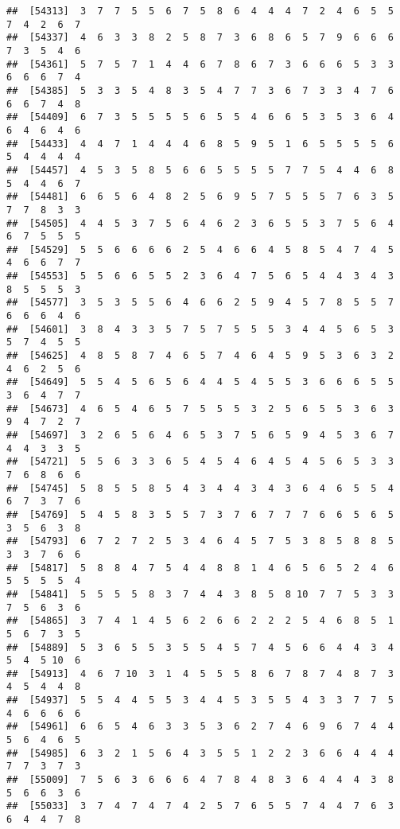 \documentclass[
]{book}
\begin{document}
\begin{verbatim}
##  [54313]  3  7  7  5  5  6  7  5  8  6  4  4  4  7  2  4  6  5  5  7  4  2  6  7
##  [54337]  4  6  3  3  8  2  5  8  7  3  6  8  6  5  7  9  6  6  6  7  3  5  4  6
##  [54361]  5  7  5  7  1  4  4  6  7  8  6  7  3  6  6  6  5  3  3  6  6  6  7  4
##  [54385]  5  3  3  5  4  8  3  5  4  7  7  3  6  7  3  3  4  7  6  6  6  7  4  8
##  [54409]  6  7  3  5  5  5  5  6  5  5  4  6  6  5  3  5  3  6  4  6  4  6  4  6
##  [54433]  4  4  7  1  4  4  4  6  8  5  9  5  1  6  5  5  5  5  6  5  4  4  4  4
##  [54457]  4  5  3  5  8  5  6  6  5  5  5  5  7  7  5  4  4  6  8  5  4  4  6  7
##  [54481]  6  6  5  6  4  8  2  5  6  9  5  7  5  5  5  7  6  3  5  7  7  8  3  3
##  [54505]  4  4  5  3  7  5  6  4  6  2  3  6  5  5  3  7  5  6  4  6  7  5  5  5
##  [54529]  5  5  6  6  6  6  2  5  4  6  6  4  5  8  5  4  7  4  5  4  6  6  7  7
##  [54553]  5  5  6  6  5  5  2  3  6  4  7  5  6  5  4  4  3  4  3  8  5  5  5  3
##  [54577]  3  5  3  5  5  6  4  6  6  2  5  9  4  5  7  8  5  5  7  6  6  6  4  6
##  [54601]  3  8  4  3  3  5  7  5  7  5  5  5  3  4  4  5  6  5  3  5  7  4  5  5
##  [54625]  4  8  5  8  7  4  6  5  7  4  6  4  5  9  5  3  6  3  2  4  6  2  5  6
##  [54649]  5  5  4  5  6  5  6  4  4  5  4  5  5  3  6  6  6  5  5  3  6  4  7  7
##  [54673]  4  6  5  4  6  5  7  5  5  5  3  2  5  6  5  5  3  6  3  9  4  7  2  7
##  [54697]  3  2  6  5  6  4  6  5  3  7  5  6  5  9  4  5  3  6  7  4  4  3  3  5
##  [54721]  5  5  6  3  3  6  5  4  5  4  6  4  5  4  5  6  5  3  3  7  6  8  6  6
##  [54745]  5  8  5  5  8  5  4  3  4  4  3  4  3  6  4  6  5  5  4  6  7  3  7  6
##  [54769]  5  4  5  8  3  5  5  7  3  7  6  7  7  7  6  6  5  6  5  3  5  6  3  8
##  [54793]  6  7  2  7  2  5  3  4  6  4  5  7  5  3  8  5  8  8  5  3  3  7  6  6
##  [54817]  5  8  8  4  7  5  4  4  8  8  1  4  6  5  6  5  2  4  6  5  5  5  5  4
##  [54841]  5  5  5  5  8  3  7  4  4  3  8  5  8 10  7  7  5  3  3  7  5  6  3  6
##  [54865]  3  7  4  1  4  5  6  2  6  6  2  2  2  5  4  6  8  5  1  5  6  7  3  5
##  [54889]  5  3  6  5  5  3  5  5  4  5  7  4  5  6  6  4  4  3  4  5  4  5 10  6
##  [54913]  4  6  7 10  3  1  4  5  5  5  8  6  7  8  7  4  8  7  3  4  5  4  4  8
##  [54937]  5  5  4  4  5  5  3  4  4  5  3  5  5  4  3  3  7  7  5  4  6  6  6  6
##  [54961]  6  6  5  4  6  3  3  5  3  6  2  7  4  6  9  6  7  4  4  5  6  4  6  5
##  [54985]  6  3  2  1  5  6  4  3  5  5  1  2  2  3  6  6  4  4  4  7  7  3  7  3
##  [55009]  7  5  6  3  6  6  6  4  7  8  4  8  3  6  4  4  4  3  8  5  6  6  3  6
##  [55033]  3  7  4  7  4  7  4  2  5  7  6  5  5  7  4  4  7  6  3  6  4  4  7  8

\end{verbatim}
\end{document}
